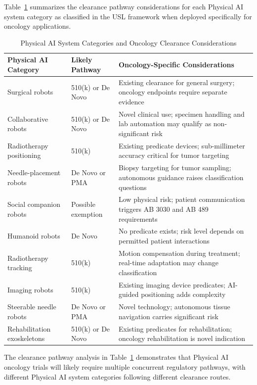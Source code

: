 Table~\ref{tab:clearance-oncology} summarizes the clearance pathway
considerations for each Physical AI system category as classified in the
USL framework \cite{usl-standard} when deployed specifically for oncology
applications.

\begin{table}[H]
\centering
\caption{Physical AI System Categories and Oncology Clearance Considerations}
\label{tab:clearance-oncology}
\small
\begin{tabularx}{\textwidth}{l l X}
\toprule
\textbf{Physical AI Category} & \textbf{Likely Pathway} & \textbf{Oncology-Specific Considerations} \\
\midrule
Surgical robots & 510(k) or De Novo & Existing clearance for general surgery; oncology endpoints require separate evidence \\
Collaborative robots & 510(k) or De Novo & Novel clinical use; specimen handling and lab automation may qualify as non-significant risk \\
Radiotherapy positioning & 510(k) & Existing predicate devices; sub-millimeter accuracy critical for tumor targeting \\
Needle-placement robots & De Novo or PMA & Biopsy targeting for tumor sampling; autonomous guidance raises classification questions \\
Social companion robots & Possible exemption & Low physical risk; patient communication triggers AB 3030 and AB 489 requirements \\
Humanoid robots & De Novo & No predicate exists; risk level depends on permitted patient interactions \\
Radiotherapy tracking & 510(k) & Motion compensation during treatment; real-time adaptation may change classification \\
Imaging robots & 510(k) & Existing imaging device predicates; AI-guided positioning adds complexity \\
Steerable needle robots & De Novo or PMA & Novel technology; autonomous tissue navigation carries significant risk \\
Rehabilitation exoskeletons & 510(k) or De Novo & Existing predicates for rehabilitation; oncology rehabilitation is novel indication \\
\bottomrule
\end{tabularx}
\end{table}

The clearance pathway analysis in Table~\ref{tab:clearance-oncology}
demonstrates that Physical AI oncology trials will likely require multiple
concurrent regulatory pathways, with different Physical AI system categories
following different clearance routes. 


